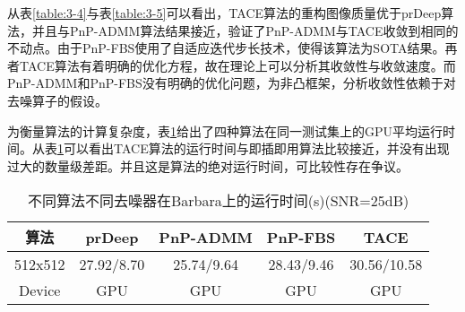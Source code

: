 从表\ref{table:3-4}与表\ref{table:3-5}可以看出，TACE算法的重构图像质量优于prDeep算法，并且与PnP-ADMM算法结果接近，验证了PnP-ADMM与TACE收敛到相同的不动点。由于PnP-FBS使用了自适应迭代步长技术，使得该算法为SOTA结果。再者TACE算法有着明确的优化方程，故在理论上可以分析其收敛性与收敛速度。而PnP-ADMM和PnP-FBS没有明确的优化问题，为非凸框架，分析收敛性依赖于对去噪算子的假设。

为衡量算法的计算复杂度，表\ref{table:3-6}给出了四种算法在同一测试集上的GPU平均运行时间。从表\ref{table:3-6}可以看出TACE算法的运行时间与即插即用算法比较接近，并没有出现过大的数量级差距。并且这是算法的绝对运行时间，可比较性存在争议。
\begin{table}[!htbp]
	\def\arraystretch{1.4}\centering{}
	\caption{不同算法不同去噪器在Barbara上的运行时间(s)(SNR=25dB)}
	\label{table:3-6}
	\begin{tabular*}{\linewidth}{@{}@{\extracolsep{\fill}}ccccc@{}}
		\toprule
		算法	& prDeep & PnP-ADMM & PnP-FBS & TACE \\ %
		\midrule
	    512x512 & 27.92/{\color{blue}8.70}   & {\color{blue}25.74}/9.64  & 28.43/9.46 & 30.56/10.58 \\
	    Device	         & GPU   & GPU  & GPU	& GPU \\
		\bottomrule
	\end{tabular*}
\end{table}

